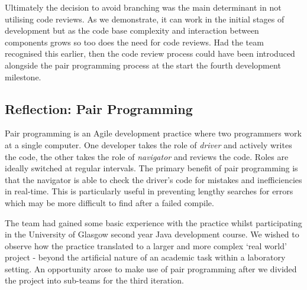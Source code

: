 \documentclass{l3proj}
\begin{document}
Ultimately the decision to avoid branching was the main determinant in not utilising code reviews. As we demonstrate, it can work in the initial stages of development but as the code base complexity and interaction between components grows so too does the need for code reviews. Had the team recognised this earlier, then the code review process could have been introduced alongside the pair programming process at the start the fourth development milestone.   

\subsection{Reflection: Pair Programming}
\label{sec:pairprogramming}





Pair programming is an Agile development practice where two programmers work at a single computer. One developer takes the role of \textit{driver} and actively writes the code, the other takes the role of \textit{navigator} and reviews the code. Roles are ideally switched at regular intervals. The primary benefit of pair programming is that the navigator is able to check the driver’s code for mistakes and inefficiencies in real-time. This is particularly useful in preventing lengthy searches for errors which may be more difficult to find after a failed compile. 

The team had gained some basic experience with the practice whilst participating in the University of Glasgow second year Java development course. We wished to observe how the practice translated to a larger and more complex `real world’ project - beyond the artificial nature of an academic task within a laboratory setting. An opportunity arose to make use of pair programming after we divided the project into sub-teams for the third iteration.
\end{document}
